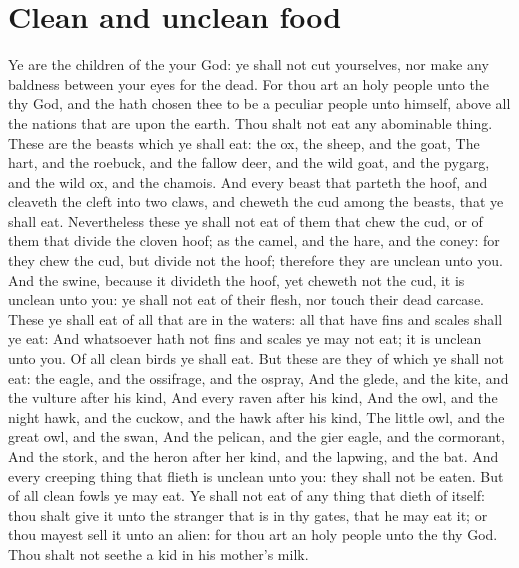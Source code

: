\section*{Clean and unclean food}
\begin{biblechapter} %
\verse Ye are the children of the \LORD your God: ye shall not cut yourselves, nor make any baldness between your eyes for the dead.
\verse For thou art an holy people unto the \LORD thy God, and the \LORD hath chosen thee to be a peculiar people unto himself, above all the nations that are upon the earth.
\verse Thou shalt not eat any abominable thing.
\verse These are the beasts which ye shall eat: the ox, the sheep, and the goat,
\verse The hart, and the roebuck, and the fallow deer, and the wild goat, and the pygarg, and the wild ox, and the chamois.
\verse And every beast that parteth the hoof, and cleaveth the cleft into two claws, and cheweth the cud among the beasts, that ye shall eat.
\verse Nevertheless these ye shall not eat of them that chew the cud, or of them that divide the cloven hoof; as the camel, and the hare, and the coney: for they chew the cud, but divide not the hoof; therefore they are unclean unto you.
\verse And the swine, because it divideth the hoof, yet cheweth not the cud, it is unclean unto you: ye shall not eat of their flesh, nor touch their dead carcase.
\verse These ye shall eat of all that are in the waters: all that have fins and scales shall ye eat:
\verse And whatsoever hath not fins and scales ye may not eat; it is unclean unto you.
\verse Of all clean birds ye shall eat.
\verse But these are they of which ye shall not eat: the eagle, and the ossifrage, and the ospray,
\verse And the glede, and the kite, and the vulture after his kind,
\verse And every raven after his kind,
\verse And the owl, and the night hawk, and the cuckow, and the hawk after his kind,
\verse The little owl, and the great owl, and the swan,
\verse And the pelican, and the gier eagle, and the cormorant,
\verse And the stork, and the heron after her kind, and the lapwing, and the bat.
\verse And every creeping thing that flieth is unclean unto you: they shall not be eaten.
\verse But of all clean fowls ye may eat.
\verse Ye shall not eat of any thing that dieth of itself: thou shalt give it unto the stranger that is in thy gates, that he may eat it; or thou mayest sell it unto an alien: for thou art an holy people unto the \LORD thy God. Thou shalt not seethe a kid in his mother's milk.

\end{biblechapter}
